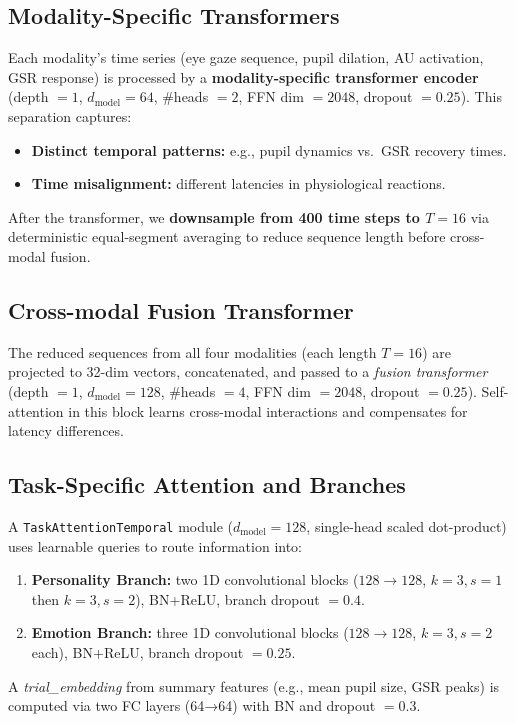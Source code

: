 \documentclass[sigconf]{acmart}
\begin{document}


\subsection{Modality-Specific Transformers}

Each modality's time series (eye gaze sequence, pupil dilation, AU activation, GSR response) is processed by a \textbf{modality-specific transformer encoder} (depth $=1$, $d_{\text{model}}=64$, \#heads $=2$, FFN dim $=2048$, dropout $=0.25$).  
This separation captures:
\begin{itemize}
    \item \textbf{Distinct temporal patterns:} e.g., pupil dynamics vs.\ GSR recovery times.
    \item \textbf{Time misalignment:} different latencies in physiological reactions.
\end{itemize}
After the transformer, we \textbf{downsample from 400 time steps to $T{=}16$} via deterministic equal-segment averaging to reduce sequence length before cross-modal fusion.

\subsection{Cross-modal Fusion Transformer}

The reduced sequences from all four modalities (each length $T{=}16$) are projected to 32-dim vectors, concatenated, and passed to a \emph{fusion transformer} (depth $=1$, $d_{\text{model}}=128$, \#heads $=4$, FFN dim $=2048$, dropout $=0.25$).  
Self-attention in this block learns cross-modal interactions and compensates for latency differences.

\subsection{Task-Specific Attention and Branches}

A \texttt{TaskAttentionTemporal} module ($d_{\text{model}}=128$, single-head scaled dot-product) uses learnable queries to route information into:
\begin{enumerate}
    \item \textbf{Personality Branch:} two 1D convolutional blocks ($128\!\to\!128$, $k=3,s=1$ then $k=3,s=2$), BN+ReLU, branch dropout $=0.4$.
    \item \textbf{Emotion Branch:} three 1D convolutional blocks ($128\!\to\!128$, $k=3,s=2$ each), BN+ReLU, branch dropout $=0.25$.
\end{enumerate}
A \emph{trial\_embedding} from summary features (e.g., mean pupil size, GSR peaks) is computed via two FC layers (64→64) with BN and dropout $=0.3$.
\end{document}
